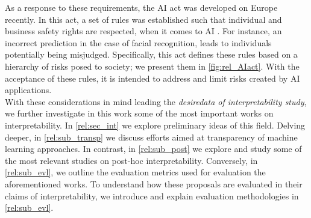 \noindent As a response to these requirements, the AI act was developed on Europe recently. In this 
act, a set of rules was established such that individual and business safety rights are respected, 
when it comes to AI \autocite{madiega2021artificial}. For instance, an incorrect  prediction in the 
case of facial recognition, leads to individuals potentially being misjudged. Specifically, this act 
defines these rules based on a hierarchy of risks posed to society; we present them in 
\ref{fig:rel_AIact}. With the acceptance of these rules, it is intended to address and limit 
risks created by AI applications.\\



With these considerations in mind leading the \emph{desiredata of interpretability study}, we further 
investigate in this work some of the most important works on interpretability. In 
\autoref{rel:sec_int} we explore preliminary ideas of this field. Delving deeper, in 
\autoref{rel:sub_transp} we discuss efforts aimed at transparency of machine learning approaches. 
In contrast, in \autoref{rel:sub_post} we explore and study 
some of the most relevant studies on post-hoc interpretability. Conversely, in 
\autoref{rel:sub_evl}, we outline the evaluation metrics used for evaluation the aforementioned 
works. To understand how these proposals are evaluated in their claims of interpretability, we 
introduce and explain evaluation methodologies in \autoref{rel:sub_evl}.







